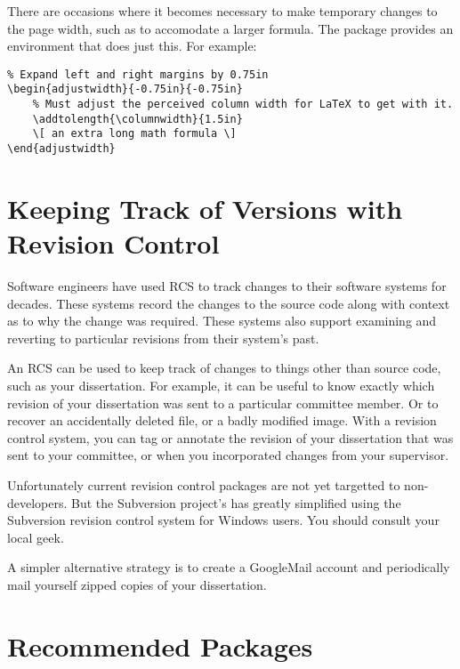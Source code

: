 There are occasions where it becomes necessary to make temporary
changes to the page width, such as to accomodate a larger formula. 
The  package provides an 
environment that does just this.  For example:
\begin{lstlisting}
% Expand left and right margins by 0.75in
\begin{adjustwidth}{-0.75in}{-0.75in}
	% Must adjust the perceived column width for LaTeX to get with it.
	\addtolength{\columnwidth}{1.5in}
	\[ an extra long math formula \]
\end{adjustwidth}
\end{lstlisting}


\section{Keeping Track of Versions with Revision Control}
\label{sec:DissertationRevisionControl}

Software engineers have used \acf{RCS} to track changes to their
software systems for decades.  These systems record the changes to
the source code along with context as to why the change was required.
These systems also support examining and reverting to particular
revisions from their system's past.

An \ac{RCS} can be used to keep track of changes to things other
than source code, such as your dissertation.  For example, it can
be useful to know exactly which revision of your dissertation was
sent to a particular committee member.  Or to recover an accidentally
deleted file, or a badly modified image.  With a revision control
system, you can tag or annotate the revision of your dissertation
that was sent to your committee, or when you incorporated changes
from your supervisor.

Unfortunately current revision control packages are not yet targetted
to non-developers.  But the Subversion project's
has greatly simplified using the Subversion revision control system
for Windows users.  You should consult your local geek.

A simpler alternative strategy is to create a GoogleMail account
and periodically mail yourself zipped copies of your dissertation.

\section{Recommended Packages}

